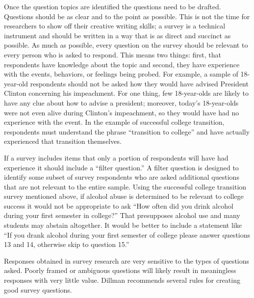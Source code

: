 Once the question topics are identified the questions need to be drafted. Questions should be as clear and to the point as possible. This is not the time for researchers to show off their creative writing skills; a survey is a technical instrument and should be written in a way that is as direct and succinct as possible. As much as possible, every question on the survey should be relevant to every person who is asked to respond. This means two things: first, that respondents have knowledge about the topic and second, they have experience with the events, behaviors, or feelings being probed. For example, a sample of 18-year-old respondents should not be asked how they would have advised President Clinton concerning his impeachment. For one thing, few 18-year-olds are likely to have any clue about how to advise a president; moreover, today's 18-year-olds were not even alive during Clinton's impeachment, so they would have had no experience with the event. In the example of successful college transition, respondents must understand the phrase ``transition to college'' and have actually experienced that transition themselves.

If a survey includes items that only a portion of respondents will have had experience it should include a ``filter question.'' A filter question is designed to identify some subset of survey respondents who are asked additional questions that are not relevant to the entire sample. Using the successful college transition survey mentioned above, if alcohol abuse is determined to be relevant to college success it would not be appropriate to ask ``How often did you drink alcohol during your first semester in college?'' That presupposes alcohol use and many students may abstain altogether. It would be better to include a statement like ``If you drank alcohol during your first semester of college please answer questions 13 and 14, otherwise skip to question 15.''

Responses obtained in survey research are very sensitive to the types of questions asked. Poorly framed or ambiguous questions will likely result in meaningless responses with very little value. Dillman\cite{dillman2011mail} recommends several rules for creating good survey questions.

